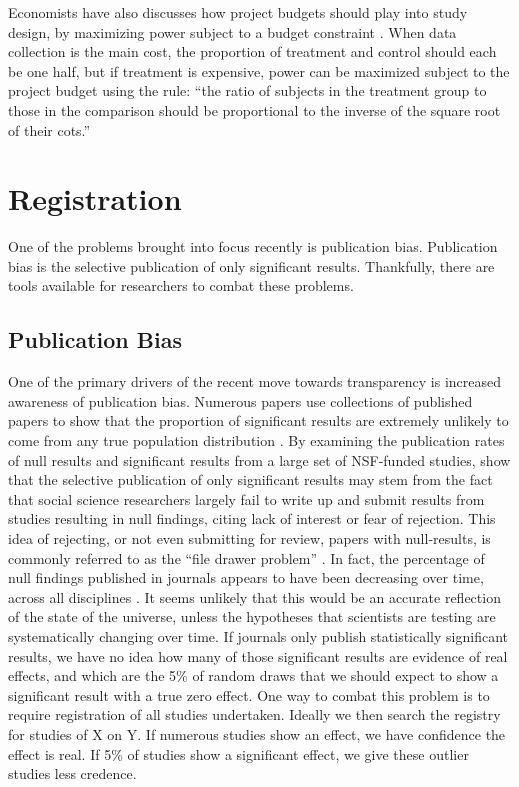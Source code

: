 \documentclass[12pt] {article}
\begin{document}
Economists have also discusses how project budgets should play into study design, by maximizing power subject to a budget constraint \cite{randomizationtoolkit}. When data collection is the main cost, the proportion of treatment and control should each be one half, but if treatment is expensive, power can be maximized subject to the project budget using the rule: ``the ratio of subjects in the treatment group to those in the comparison should be proportional to the inverse of the square root of their cots.''  
 


\section{Registration}\label{registration}

One of the problems brought into focus recently is publication bias.
Publication bias is the selective publication of only significant
results. Thankfully, there are tools available for researchers to combat
these problems.

\subsection{Publication Bias}\label{publication-bias}

One of the primary drivers of the recent move towards transparency is
increased awareness of publication bias. Numerous papers use collections
of published papers to show that the proportion of significant results
are extremely unlikely to come from any true population distribution
\citep{delong_are_1992, gerber_testing_2001,  ioannidis_why_2005}. By examining the publication rates of null results and
significant results from a large set of NSF-funded studies, \cite{franco_publication_2014} show that the selective publication of only
significant results may stem from the fact that social science
researchers largely fail to write up and submit results from studies
resulting in null findings, citing lack of interest or fear of
rejection. This idea of rejecting, or not even submitting for review, papers with null-results, is commonly referred to as the ``file drawer problem'' \citep{rosenthal1979file}. In fact, the percentage of null findings published in
journals appears to have been decreasing over time, across all
disciplines \citep{fanelli_negative_2012}. It seems unlikely that this would
be an accurate reflection of the state of the universe, unless the hypotheses that scientists are testing are systematically changing over time. If journals only
publish statistically significant results, we have no idea how many of
those significant results are evidence of real effects, and which are
the 5\% of random draws that we should expect to show a significant
result with a true zero effect. One way to combat this problem is to
require registration of all studies undertaken. Ideally we then search
the registry for studies of X on Y. If numerous studies show an
effect, we have confidence the effect is real. If 5\% of studies show a
significant effect, we give these outlier studies less credence.
\end{document}
